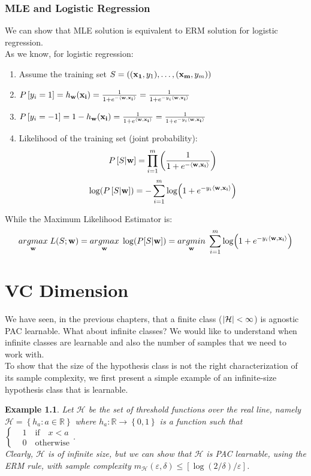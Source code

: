 \documentclass[12pt]{report}
\theoremstyle{plain}
\newtheorem{EX}{Example}
\newcommand\mcl[1]{\mathcal{#1}}
\newcommand\sprod[2]{\langle \vb{#1},\vb{#2}\rangle}
\begin{document}
\begin{flushleft}
\subsection{MLE and Logistic Regression}
We can show that MLE solution is equivalent to ERM solution for logistic 
regression.\\
As we know, for logistic regression:
\begin{enumerate}
	\item Assume the training set 
	$S=\left((\vb{x_1},y_1),\dots,(\vb{x_m},y_m)\right)$
	\item 
	$P\left[y_i=1\right]=h_{\vb{w}}(\vb{x_i})=\frac{1}{1+e^{-\sprod{w}{x_i}}}=\frac{1}{1+e^{-y_i\sprod{w}{x_i}}}$
	\item 	
	$P\left[y_i=-1\right]=1-h_{\vb{w}}(\vb{x_i})=\frac{1}{1+e^{\sprod{w}{x_i}}}=\frac{1}{1+e^{-y_i\sprod{w}{x_i}}}$
	\item Likelihood of the training set (joint probability):
	\[ P\left[S|\vb{w}\right]=\prod_{i=1}^m 
	\left(\frac{1}{1+e^{-\sprod{w}{x_i}}}\right) \]
	\[ \log(P\left[S|\vb{w}\right])=-\sum_{i=1}^m 
	\log(1+e^{-y_i\sprod{w}{x_i}}) 
	\]
\end{enumerate}
While the Maximum Likelihood Estimator is:
\[ \underset{\vb{w}}{argmax}\;L(S;\vb{w})=\underset{\vb{w}}{argmax}\; 
\log(P[S|\vb{w}])=\underset{\vb{w}}{argmin}\;\sum_{i=1}^m 
\log(1+e^{-y_i\sprod{w}{x_i}}) \]



\chapter{VC Dimension}
We have seen, in the previous chapters, that a finite class 
($\abs{\mcl{H}}<\infty$) is agnostic PAC learnable. What about infinite 
classes? We would like to understand when infinite classes are learnable and 
also the number of samples that we need to work with.\\ To show that the size 
of the hypothesis class is not the right characterization of its sample 
complexity, we first present a simple example of an infinite-size hypothesis 
class that is learnable.\\

\vspace{0.5cm}
\begin{EX}
	Let $\mcl{H}$ be the set of \textit{threshold functions} over the real line, namely $\mcl{H}=\left\{h_a:a\in\mathds{R}\right\}$ where $h_a:\mathds{R}\to\left\{0,1\right\}$ is a function such that $\left\{\begin{aligned}&1\quad\text{if}\quad x<a\\&0\quad\text{otherwise}\end{aligned}\right.$.\\
	Clearly, $\mcl{H}$ is of infinite size, but we can show that $\mcl{H}$ is PAC learnable, using the ERM rule, with sample complexity $m_\mcl{H}(\varepsilon,\delta)\leq\left[\log(2/\delta)/\varepsilon\right]$.
	

\end{EX}
\end{flushleft}
\end{document}
